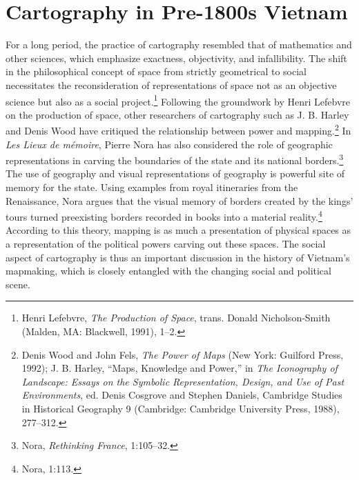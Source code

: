 \section{Cartography in Pre-1800s Vietnam}\label{sec:historiography}
For a long period, the practice of cartography resembled that of mathematics and other sciences, which emphasize exactness, objectivity, and infallibility. The shift in the philosophical concept of space from strictly geometrical to social necessitates the reconsideration of representations of space not as an objective science but also as a social project.\footnote{Henri Lefebvre, \textit{The Production of Space}, trans. Donald Nicholson-Smith (Malden, MA: Blackwell, 1991), 1–2.}  Following the groundwork by Henri Lefebvre on the production of space, other researchers of cartography such as J. B. Harley and Denis Wood have critiqued the relationship between power and mapping.\footnote{Denis Wood and John Fels, \textit{The Power of Maps} (New York: Guilford Press, 1992); J. B. Harley, “Maps, Knowledge and Power,” in \textit{The Iconography of Landscape: Essays on the Symbolic Representation, Design, and Use of Past Environments}, ed. Denis Cosgrove and Stephen Daniels, Cambridge Studies in Historical Geography 9 (Cambridge: Cambridge University Press, 1988), 277–312.}  In \textit{Les Lieux de mémoire}, Pierre Nora has also considered the role of geographic representations in carving the boundaries of the state and its national borders.\footnote{Nora, \textit{Rethinking France}, 1:105–32.} The use of geography and visual representations of geography is powerful site of memory for the state. Using examples from royal itineraries from the Renaissance, Nora argues that the visual memory of borders created by the kings’ tours turned preexisting borders recorded in books into a material reality.\footnote{Nora, 1:113.} According to this theory, mapping is as much a presentation of physical spaces as a representation of the political powers carving out these spaces. The social aspect of cartography is thus an important discussion in the history of Vietnam’s mapmaking, which is closely entangled with the changing social and political scene.

